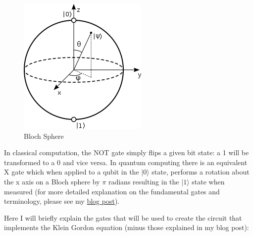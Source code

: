 \documentclass{article}
\begin{document}
\begin{figure}[!htb]
\includegraphics[scale=0.55]{../images/bloch_sphere}
  \centering
  \caption{Bloch Sphere \cite{blochsphere}}
\end{figure}

In classical computation, the NOT gate simply flips a given bit state: a 1 will be transformed to a 0 and vice versa. In quantum computing there is an equivalent X gate which when applied to a qubit in the $|0\rangle$ state, performs a rotation about the x axis on a Bloch sphere by $\pi$ radians resulting in the $|1\rangle$ state when measured (for more detailed explanation on the fundamental gates and terminology, please see my \href{https://desireevl.github.io/archive/2019/04/03/quantum-intro.html}{blog post}).

Here I will briefly explain the gates that will be used to create the circuit that implements the Klein Gordon equation (minus those explained in my blog post):
\newline
\end{document}

